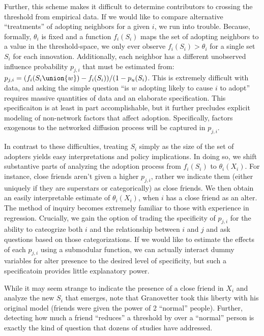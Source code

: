 \documentclass{article}
\begin{document}
Further, this scheme makes it difficult to determine contributors to crossing the threshold from empirical data. If we would like to compare alternative ``treatments'' of adopting neighbors for a given $i$, we run into trouble. Because, formally, $\theta_i$ is fixed and a function $f_i(S_i)$ maps the set of adopting neighbors to a value in the threshold-space, we only ever observe $f_i(S_i) > \theta_i$ for a single set $S_i$ for each innovation. Additionally, each neighbor has a different unobserved influence probability $p_{j,i}$ that must be estimated from: $p_{j,i} = (f_i(S_i \union {w}) - f_i(S_i))/(1-p_u(S_i)$. This is extremely difficult with data, and asking the simple question ``is $w$ adopting likely to cause $i$ to adopt'' requires massive quantities of data and an elaborate specification. This specificaiton is at least in part accomplishable, but it further precludes explicit modeling of non-network factors that affect adoption. Specifically, factors exogenous to the networked diffusion process will be captured in $p_{j,i}$.

In contrast to these difficulties, treating $S_i$ simply as the size of the set of adopters yields easy interpretations and policy implications. In doing so, we shift substantive parts of analyzing the adoption process from $f_i(S_i)$ to $\theta_i(X_i)$. For instance, close friends aren't given a higher $p_{j,i}$, rather we indicate them (either uniquely if they are superstars or categorically) as close friends. We then obtain an easily interpretable estimate of $\theta_i(X_i)$, when $i$ has a close friend as an alter. The method of inquiry becomes extremely familiar to those with experience in regression. Crucially, we gain the option of trading the specificity of $p_{j,i}$ for the ability to cateogrize both $i$ and the relationship between $i$ and $j$ and ask questions based on those categorizations. If we would like to estimate the effects of each $p_{j,i}$ using a submodular function, we can actually interact dummy variables for alter presence to the desired level of specificity, but such a specificatoin provides little explanatory power.

While it may seem strange to indicate the presence of a close friend in $X_i$ and analyze the new $S_i$ that emerges, note that Granovetter took this liberty with his original model (friends were given the power of 2 ``normal'' people). Further, detecting how much a friend ``reduces'' a threshold by over a ``normal'' person is exactly the kind of question that dozens of studies have addressed.
\end{document}
